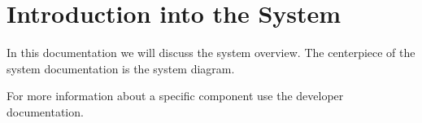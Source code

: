 \author{Tadd\"aus Nauheimer}
\chapter{Introduction into the System}

In this documentation we will discuss the system overview.
The centerpiece of the system documentation is the system diagram.

For more information about a specific component use the developer documentation.


